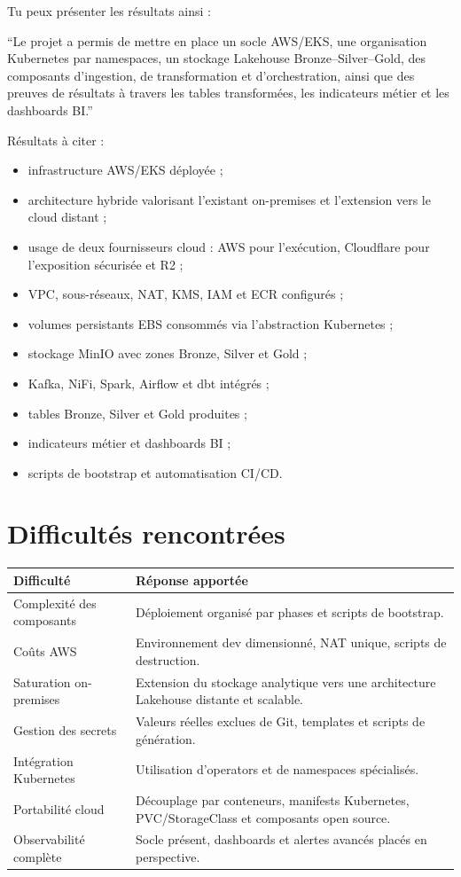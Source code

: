 \documentclass[11pt,a4paper]{article}
\newcommand{\important}[1]{%
  \vspace{0.25cm}
  \noindent
  \colorbox{softblue}{%
    \parbox{\dimexpr\textwidth-2\fboxsep\relax}{#1}%
  }
  \vspace{0.2cm}
}
\begin{document}
Tu peux présenter les résultats ainsi :

\important{
``Le projet a permis de mettre en place un socle AWS/EKS, une organisation Kubernetes par namespaces, un stockage Lakehouse Bronze--Silver--Gold, des composants d'ingestion, de transformation et d'orchestration, ainsi que des preuves de résultats à travers les tables transformées, les indicateurs métier et les dashboards BI.''
}

Résultats à citer :
\begin{itemize}
  \item infrastructure AWS/EKS déployée ;
  \item architecture hybride valorisant l'existant on-premises et l'extension vers le cloud distant ;
  \item usage de deux fournisseurs cloud : AWS pour l'exécution, Cloudflare pour l'exposition sécurisée et R2 ;
  \item VPC, sous-réseaux, NAT, KMS, IAM et ECR configurés ;
  \item volumes persistants EBS consommés via l'abstraction Kubernetes ;
  \item stockage MinIO avec zones Bronze, Silver et Gold ;
  \item Kafka, NiFi, Spark, Airflow et dbt intégrés ;
  \item tables Bronze, Silver et Gold produites ;
  \item indicateurs métier et dashboards BI ;
  \item scripts de bootstrap et automatisation CI/CD.
\end{itemize}

\section{Difficultés rencontrées}

\begin{tabularx}{\textwidth}{@{}p{}X@{}}
\toprule
\textbf{Difficulté} & \textbf{Réponse apportée} \\
\midrule
Complexité des composants & Déploiement organisé par phases et scripts de bootstrap. \\
Coûts AWS & Environnement dev dimensionné, NAT unique, scripts de destruction. \\
Saturation on-premises & Extension du stockage analytique vers une architecture Lakehouse distante et scalable. \\
Gestion des secrets & Valeurs réelles exclues de Git, templates et scripts de génération. \\
Intégration Kubernetes & Utilisation d'operators et de namespaces spécialisés. \\
Portabilité cloud & Découplage par conteneurs, manifests Kubernetes, PVC/StorageClass et composants open source. \\
Observabilité complète & Socle présent, dashboards et alertes avancés placés en perspective. \\
\bottomrule
\end{tabularx}
\end{document}

